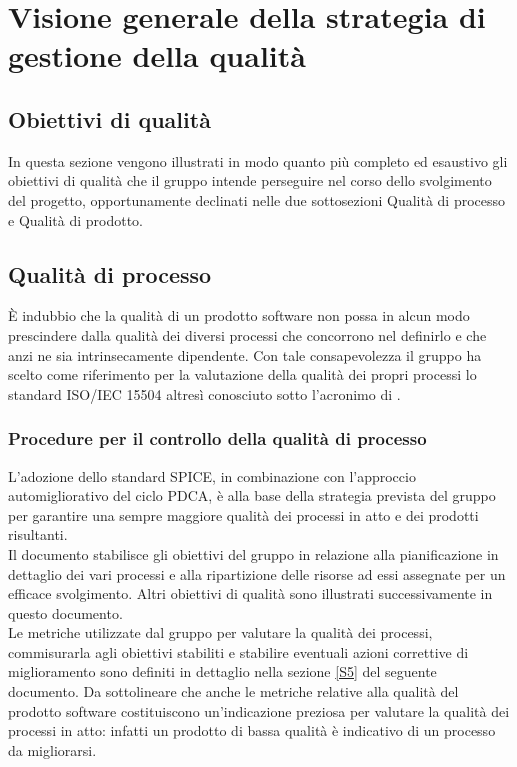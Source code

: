 \section{Visione generale della strategia di gestione della qualità}
	\subsection{Obiettivi di qualità}
	In questa sezione vengono illustrati in modo quanto più completo ed esaustivo gli obiettivi di qualità che il gruppo intende perseguire nel corso 	dello svolgimento del progetto, opportunamente declinati nelle due sottosezioni Qualità di processo e Qualità di prodotto.

	\subsection{Qualità di processo}
	È indubbio che la qualità di un prodotto software non possa in alcun modo prescindere dalla qualità dei diversi processi che concorrono nel definirlo e 	che anzi ne sia intrinsecamente dipendente. Con tale consapevolezza il gruppo ha scelto come riferimento per la valutazione della qualità dei propri processi lo standard ISO/IEC 15504 altresì conosciuto sotto l'acronimo di .
		\subsubsection{Procedure per il controllo della qualità di processo}
		L'adozione dello standard SPICE, in combinazione con l'approccio automigliorativo del ciclo PDCA, è alla base della strategia prevista del gruppo per garantire una sempre maggiore qualità dei processi in atto e dei prodotti risultanti.
		\\Il documento \PdP{} stabilisce gli obiettivi del gruppo in relazione alla pianificazione in dettaglio dei vari processi e alla ripartizione delle risorse ad essi assegnate per un efficace svolgimento. Altri obiettivi di qualità sono illustrati successivamente in questo documento.
		\\Le metriche utilizzate dal gruppo per valutare la qualità dei processi, commisurarla agli obiettivi stabiliti e stabilire eventuali azioni correttive di miglioramento sono definiti in dettaglio nella sezione \ref{S5} del seguente documento. Da sottolineare che anche le metriche relative alla qualità del prodotto software costituiscono un'indicazione preziosa per valutare la qualità dei processi in atto: infatti un prodotto di bassa qualità è indicativo di un processo da migliorarsi.

